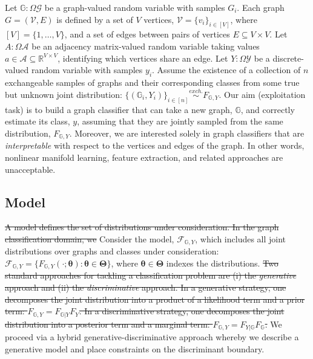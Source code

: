 \documentclass[10pt,journal,cspaper,compsoc]{IEEEtran}
\providecommand{\tr}[1]{\textcolor{red}{#1}}
\providecommand{\ve}[1]{\boldsymbol{#1}}
\newcommand{\GG}{\mathbb{G}}
\newcommand{\bth}{\ve{\theta}}
\newcommand{\bTh}{\ve{\Theta}}
\providecommand{\mc}[1]{\mathcal{#1}}
\newcommand{\Real}{\mathbb{R}}
\begin{document}
Let $\GG: \Omega  \mc{G}$ be a graph-valued random variable with samples $G_i$.  Each graph $G=(\mc{V},E)$ is defined by a set of $V$ vertices, $\mc{V}=\{v_i\}_{i \in [V]}$, where $[V]=\{1,\ldots, V\}$, and a set of  edges between pairs of vertices $E \subseteq V \times V$. Let $A: \Omega  \mc{A}$ be an adjacency matrix-valued random variable taking values $a \in \mc{A} \subseteq \Real^{V \times V}$, identifying which vertices share an edge. Let $Y:\Omega  \mc{Y}$ be a discrete-valued random variable with samples $y_i$.  Assume the existence of a collection of $n$ exchangeable samples of graphs and their corresponding classes from some true but unknown joint distribution: $\{(\GG_i,Y_i)\}_{i \in [n]} \overset{exch.}{\sim} F_{\GG,Y}$. Our aim (exploitation task) is to build a graph classifier that can take a new graph, $\GG$, and correctly estimate its class, $y$, assuming that they are jointly sampled from the same distribution, $F_{\GG,Y}$.  Moreover, we are interested solely in graph classifiers that are \emph{interpretable} with respect to the vertices and edges of the graph. In other words, nonlinear manifold learning, feature extraction, and related approaches are unacceptable.  

\subsection{Model} %
\label{sub:model}

\sout{A model defines the set of distributions under consideration.  In the graph classification domain, we} Consider the model, $\mc{F}_{\GG,Y}$, which includes all joint distributions over graphs and classes under consideration: $\mc{F}_{\GG,Y}=\{F_{\GG, Y}(\cdot; \bth) : \bth \in \bTh\}$, where $\bth \in \bTh$ indexes the distributions.  \sout{Two standard approaches for tackling a classification problem are (i) the \emph{generative} approach and (ii) the \emph{discriminative} approach.  In a generative strategy, one decomposes the joint distribution into a product of a likelihood term and a prior term:  $F_{\GG,Y}=F_{\GG | Y}F_Y$.  In a discriminative strategy, one decomposes the joint distribution into a posterior term and a marginal term: $F_{\GG,Y}=F_{Y | \GG}F_{\GG}$.}  We proceed via a hybrid generative-discriminative approach \tr{\cite{Lasserre2006}} whereby we describe a generative model and place constraints on the discriminant boundary.
\end{document}
